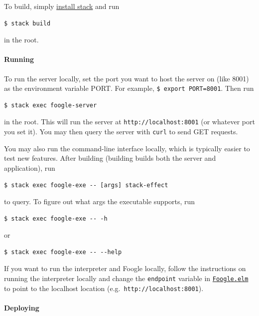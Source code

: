 \documentclass[
]{article}
\begin{document}
To build, simply
\href{https://docs.haskellstack.org/en/stable/install_and_upgrade/}{install
stack} and run

\begin{verbatim}
$ stack build
\end{verbatim}

in the root.

\hypertarget{running}{%
\paragraph{Running}\label{running}}

To run the server locally, set the port you want to host the server on
(like 8001) as the environment variable PORT. For example,
\texttt{\$\ export\ PORT=8001}. Then run

\begin{verbatim}
$ stack exec foogle-server
\end{verbatim}

in the root. This will run the server at \texttt{http://localhost:8001}
(or whatever port you set it). You may then query the server with
\texttt{curl} to send GET requests.

You may also run the command-line interface locally, which is typically
easier to test new features. After building (building builds both the
server and application), run

\begin{verbatim}
$ stack exec foogle-exe -- [args] stack-effect
\end{verbatim}

to query. To figure out what args the executable supports, run

\begin{verbatim}
$ stack exec foogle-exe -- -h
\end{verbatim}

or

\begin{verbatim}
$ stack exec foogle-exe -- --help
\end{verbatim}

If you want to run the interpreter and Foogle locally, follow the
instructions on running the interpreter locally and change the
\texttt{endpoint} variable in
\href{https://github.com/factor-hmc/simple-interpreter/blob/master/src/Foogle.elm}{\texttt{Foogle.elm}}
to point to the localhost location
(e.g.~\texttt{http://localhost:8001}). 


\hypertarget{deploying}{%
\paragraph{Deploying}\label{deploying}}
\end{document}
